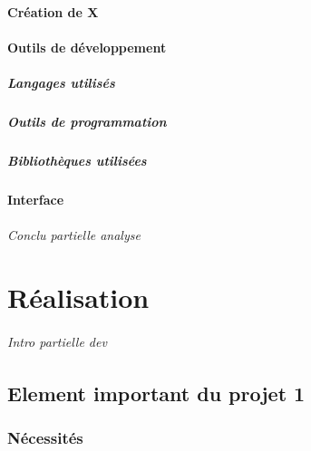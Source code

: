 \documentclass[
	headsepline=on,
	footsepline=on,
	twoside=off,
	abstract=on,
	DIV=10
]{scrreprt}
\begin{document}
			\subsection{Création de X}
			
			\subsection{Outils de développement}
			
				\subsubsection{Langages utilisés}
				
				\subsubsection{Outils de programmation}
				
				\subsubsection{Bibliothèques utilisées}
				
			\subsection{Interface}
		
		\paragraph{Conclu partielle analyse}
			
	\part{Réalisation}
	
		\paragraph{Intro partielle dev}
		\chapter{Element important du projet 1}
		
			\section{Nécessités}
			
\end{document}
